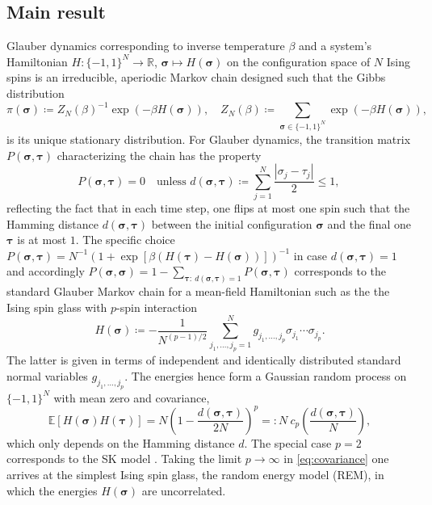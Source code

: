 \documentclass[letterpaper, DIV=17]{scrartcl}
\numberwithin{equation}{section}
\theoremstyle{definition}
\newcommand{\btau}{\boldsymbol{\tau} }
\newcommand{\bsig}{\boldsymbol{\sigma} }
\begin{document}
\subsection{Main result}
Glauber dynamics corresponding to inverse temperature $ \beta $ and a system's Hamiltonian $ H : \{ -1,1\}^N \to \mathbb{R} $, $ \bsig \mapsto H(\bsig) $ on the configuration space of $ N $ Ising spins is an irreducible, aperiodic Markov chain 
designed such that the Gibbs distribution
\begin{equation}
    \pi(\bsig) \coloneqq Z_N(\beta)^{-1} \exp\left(- \beta H(\bsig)\right) , \quad Z_N(\beta) \coloneqq \sum_{\bsig \in \{-1,1\}^N} \exp\left(- \beta H(\bsig)\right) ,
\end{equation}
is its unique stationary distribution. For Glauber dynamics, the transition matrix $ P(\bsig,\btau) $ characterizing the chain
has the property
\begin{equation}\label{eq:walk}
    P(\bsig,\btau) = 0 \quad \mbox{unless $\displaystyle  d(\bsig,\btau) \coloneqq \sum_{j=1}^N \frac{|\sigma_j - \tau_j|}{2}  \leq 1 $, }
\end{equation} 
reflecting the fact that 
in each time step, one flips at most one spin such that the Hamming distance $ d(\bsig,\btau) $ between the initial configuration $ \bsig $ and the final one $ \btau $ is at most $1$. 
The specific choice $ P(\bsig,\btau) = N^{-1} \left( 1+ \exp\left[\beta (H(\btau) - H(\bsig) )\right] \right)^{-1} $ in case $ d(\bsig,\btau) = 1$ and accordingly $ P(\bsig,\bsig) = 1- \sum_{\btau :\  d(\bsig,\btau) = 1} P(\bsig,\btau)$ corresponds to the standard Glauber Markov chain for a mean-field Hamiltonian such as the the Ising spin glass with $ p $-spin interaction 
\begin{equation}\label{eq:pspin}
    H(\bsig) \coloneqq - \frac{1}{N^{(p-1)/2}} \sum_{j_1, \dots , j_p = 1 }^N g_{j_1, \dots , j_p} \sigma_{j_1} \cdots \sigma_{j_p} .
\end{equation}
The latter is given in terms of independent and identically distributed standard normal variables $ g_{j_1, \dots , j_p}$. The energies hence form a 
Gaussian random process on $ \{ -1 , 1\}^N $ with mean zero and covariance, 
\begin{equation}\label{eq:covariance}
\mathbb{E}[H(\bsig) H(\btau) ] = N  \left( 1 - \frac{d(\bsig,\btau)}{2N} \right)^p =: N \ c_p\left( \frac{d(\bsig,\btau)}{N}\right) , 
\end{equation}
which only depends on the Hamming distance $ d $. 
The special case $ p = 2 $ corresponds to the SK model \cite{SK75}. Taking the limit $ p \to \infty $ in \eqref{eq:covariance} one arrives at the simplest Ising spin glass, the random energy model (REM), in which the energies $ H(\bsig) $ are uncorrelated. 
\end{document}
